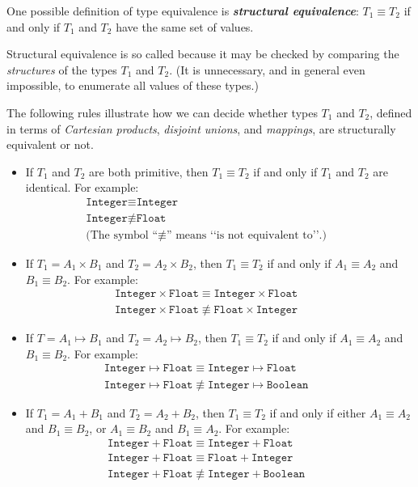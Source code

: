 \documentclass{article}
\begin{document}
One possible definition of type equivalence is \textbf{\textit{structural equivalence}}: $T_1 \equiv T_2$ if and only if $T_1$ and $T_2$ have the same set of values. 

Structural equivalence is so called because it may be checked by comparing the \textit{structures} of the types $T_1$ and $T_2$. (It is unnecessary, and in general even impossible, to enumerate all values of these types.)

The following rules illustrate how we can decide whether types $T_1$ and
$T_2$, defined in terms of \textit{Cartesian products}, \textit{disjoint unions}, and \textit{mappings}, are structurally equivalent or not.
\begin{itemize}
    \item If $T_1$ and $T_2$ are both primitive, then $T_1 \equiv T_2$ if and only if $T_1$ and $T_2$ are identical. For example:
        \begin{align*}
            &\texttt{Integer} \equiv \texttt{Integer}&&&&\\
            &\texttt{Integer} \not\equiv \texttt{Float} &&&&\\
            &\text{(The symbol ``$\not\equiv$'' means ‘‘is not equivalent to’’.)}&&&&
        \end{align*}
    
    \item If $T_1 = A_1 \times B_1$ and $T_2 = A_2 \times B_2$, then $T_1 \equiv T_2$ if and only if $A_1 \equiv A_2$ and $B_1 \equiv B_2$. For example:
        \begin{align*}
            &\texttt{Integer} \times \texttt{Float} \equiv \texttt{Integer} \times \texttt{Float} &&&&\\
            &\texttt{Integer} \times \texttt{Float} \not\equiv \texttt{Float} \times \texttt{Integer} &&&&
        \end{align*}
    
    \item If $T = A_1 \mapsto B_1$ and $T_2 = A_2 \mapsto B_2$, then $T_1 \equiv T_2$ if and only if $A_1 \equiv A_2$ and $B_1 \equiv B_2$. For example:
        \begin{align*}
            &\texttt{Integer} \mapsto \texttt{Float} \equiv \texttt{Integer} \mapsto \texttt{Float}&&&&\\
            &\texttt{Integer} \mapsto \texttt{Float} \not\equiv \texttt{Integer} \mapsto \texttt{Boolean}
        \end{align*}
    
    \item If $T_1 = A_1 + B_1$ and $T_2 = A_2 + B_2$, then $T_1 \equiv T_2$ if and only if either $A_1 \equiv A_2$ and $B_1 \equiv B_2$, or $A_1 \equiv B_2$ and $B_1 \equiv A_2$. For example:
        \begin{align*}
            &\texttt{Integer} + \texttt{Float} \equiv \texttt{Integer} + \texttt{Float} &&&&\\
            &\texttt{Integer} + \texttt{Float} \equiv \texttt{Float} + \texttt{Integer} &&&&\\
            &\texttt{Integer} + \texttt{Float} \not\equiv \texttt{Integer} + \texttt{Boolean}
        \end{align*}
    

\end{itemize}
\end{document}
